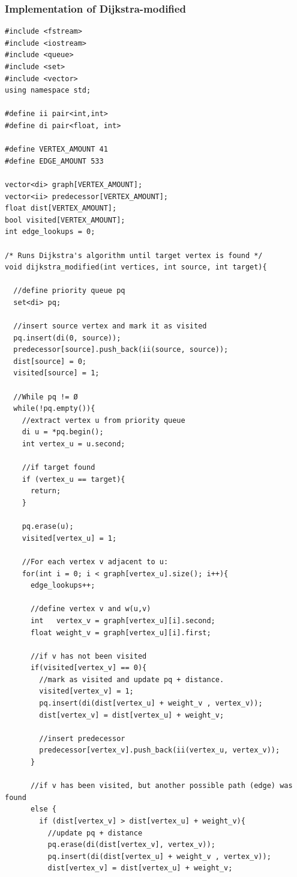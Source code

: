 \documentclass[11pt]{article}
\begin{document}
\subsubsection{Implementation of Dijkstra-modified}
\begin{lstlisting}
#include <fstream>
#include <iostream>
#include <queue>
#include <set>
#include <vector>
using namespace std;

#define ii pair<int,int>
#define di pair<float, int>

#define VERTEX_AMOUNT 41
#define EDGE_AMOUNT 533

vector<di> graph[VERTEX_AMOUNT];
vector<ii> predecessor[VERTEX_AMOUNT];
float dist[VERTEX_AMOUNT];
bool visited[VERTEX_AMOUNT];
int edge_lookups = 0;

/* Runs Dijkstra's algorithm until target vertex is found */
void dijkstra_modified(int vertices, int source, int target){
	
  //define priority queue pq
  set<di> pq;
	
  //insert source vertex and mark it as visited
  pq.insert(di(0, source));
  predecessor[source].push_back(ii(source, source));
  dist[source] = 0;
  visited[source] = 1;

  //While pq != Ø
  while(!pq.empty()){
    //extract vertex u from priority queue
    di u = *pq.begin();	
    int vertex_u = u.second;
		
    //if target found
    if (vertex_u == target){
      return;
    }

    pq.erase(u);
    visited[vertex_u] = 1;

    //For each vertex v adjacent to u:
    for(int i = 0; i < graph[vertex_u].size(); i++){
      edge_lookups++;

      //define vertex v and w(u,v)
      int   vertex_v = graph[vertex_u][i].second;
      float weight_v = graph[vertex_u][i].first;

      //if v has not been visited
      if(visited[vertex_v] == 0){
        //mark as visited and update pq + distance.
        visited[vertex_v] = 1;
        pq.insert(di(dist[vertex_u] + weight_v , vertex_v));
        dist[vertex_v] = dist[vertex_u] + weight_v;

        //insert predecessor
        predecessor[vertex_v].push_back(ii(vertex_u, vertex_v));
      }

      //if v has been visited, but another possible path (edge) was found
      else {
        if (dist[vertex_v] > dist[vertex_u] + weight_v){
          //update pq + distance
          pq.erase(di(dist[vertex_v], vertex_v));
          pq.insert(di(dist[vertex_u] + weight_v , vertex_v));
          dist[vertex_v] = dist[vertex_u] + weight_v;
				

\end{lstlisting}
\end{document}
